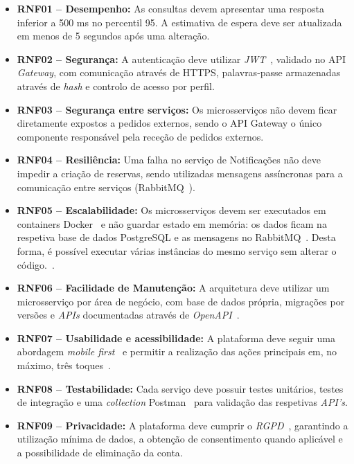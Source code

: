 \begin{itemize}
    \setlength{\itemsep}{10pt}

    \item \textbf{RNF01 -- Desempenho:} As consultas devem apresentar uma resposta inferior a 500 ms no percentil 95. A estimativa de espera deve ser atualizada em menos de 5 segundos após uma alteração.

    \item \textbf{RNF02 -- Segurança:} A autenticação deve utilizar \textit{JWT}~\cite{rfc7519}, validado no API \textit{Gateway}, com comunicação através de HTTPS, palavras-passe armazenadas através de \textit{hash} e controlo de acesso por perfil.

    \item \textbf{RNF03 -- Segurança entre serviços:} Os microsserviços não devem ficar diretamente expostos a pedidos externos, sendo o API Gateway o único componente responsável pela receção de pedidos externos.

    \item \textbf{RNF04 -- Resiliência:} Uma falha no serviço de Notificações não deve impedir a criação de reservas, sendo utilizadas mensagens assíncronas para a comunicação entre serviços (RabbitMQ~\cite{rabbitmq}).

    \item \textbf{RNF05 -- Escalabilidade:} Os microsserviços devem ser executados em containers Docker~\cite{docker} e não guardar estado em memória: os dados ficam na respetiva base de dados PostgreSQL e as mensagens no RabbitMQ~\cite{rabbitmq}. Desta forma, é possível executar várias instâncias do mesmo serviço sem alterar o código.~\cite{docker}.

    \item \textbf{RNF06 -- Facilidade de Manutenção:} A arquitetura deve utilizar um microsserviço por área de negócio, com base de dados própria, migrações por versões e \textit{APIs} documentadas através de \textit{OpenAPI}~\cite{openapi}.

    \item \textbf{RNF07 -- Usabilidade e acessibilidade:} A plataforma deve seguir uma abordagem \textit{mobile first}~\cite{wroblewski} e permitir a realização das ações principais em, no máximo, três toques~\cite{nielsen}.

    \item \textbf{RNF08 -- Testabilidade:} Cada serviço deve possuir testes unitários, testes de integração e uma \textit{collection} Postman~\cite{postman} para validação das respetivas \textit{API's}.

    \item \textbf{RNF09 -- Privacidade:} A plataforma deve cumprir o \textit{RGPD}~\cite{rgpd}, garantindo a utilização mínima de dados, a obtenção de consentimento quando aplicável e a possibilidade de eliminação da conta.

\end{itemize}

